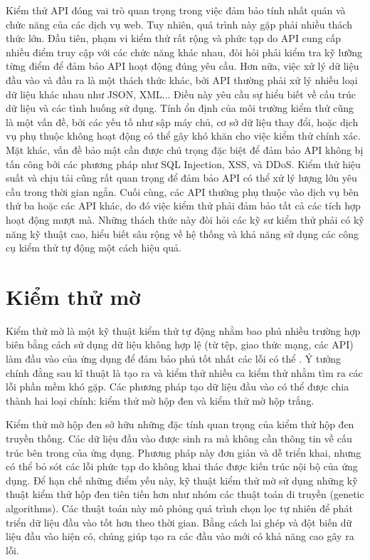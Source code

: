 Kiểm thử API đóng vai trò quan trọng trong việc đảm bảo tính nhất quán và chức năng của các dịch vụ web. Tuy nhiên, quá trình này gặp phải nhiều thách thức lớn. Đầu tiên, phạm vi kiểm thử rất rộng và phức tạp do API cung cấp nhiều điểm truy cập với các chức năng khác nhau, đòi hỏi phải kiểm tra kỹ lưỡng từng điểm để đảm bảo API hoạt động đúng yêu cầu. Hơn nữa, việc xử lý dữ liệu đầu vào và đầu ra là một thách thức khác, bởi API thường phải xử lý nhiều loại dữ liệu khác nhau như JSON, XML... Điều này yêu cầu sự hiểu biết về cấu trúc dữ liệu và các tình huống sử dụng. Tính ổn định của môi trường kiểm thử cũng là một vấn đề, bởi các yếu tố như sập máy chủ, cơ sở dữ liệu thay đổi, hoặc dịch vụ phụ thuộc không hoạt động có thể gây khó khăn cho việc kiểm thử chính xác. Mặt khác, vấn đề bảo mật cần được chú trọng đặc biệt để đảm bảo API không bị tấn công bởi các phương pháp như SQL Injection, XSS, và DDoS. Kiểm thử hiệu suất và chịu tải cũng rất quan trọng để đảm bảo API có thể xử lý lượng lớn yêu cầu trong thời gian ngắn. Cuối cùng, các API thường phụ thuộc vào dịch vụ bên thứ ba hoặc các API khác, do đó việc kiểm thử phải đảm bảo tất cả các tích hợp hoạt động mượt mà. Những thách thức này đòi hỏi các kỹ sư kiểm thử phải có kỹ năng kỹ thuật cao, hiểu biết sâu rộng về hệ thống và khả năng sử dụng các công cụ kiểm thử tự động một cách hiệu quả.



\section{Kiểm thử mờ}
Kiểm thử mờ là một kỹ thuật kiểm thử tự động nhằm bao phủ nhiều trường hợp biên bằng cách sử dụng dữ liệu không hợp lệ (từ tệp, giao thức mạng, các API) làm đầu vào của ứng dụng để đảm bảo phủ tốt nhất các lỗi có thể \cite{8371326}. Ý tưởng chính đằng sau kĩ thuật là tạo ra và kiểm thử nhiều ca kiểm thử nhằm tìm ra các lỗi phần mềm khó gặp. Các phương pháp tạo dữ liệu đầu vào có thể được chia thành hai loại chính: kiểm thử mờ hộp đen và kiểm thử mờ hộp trắng.

Kiểm thử mờ hộp đen sở hữu những đặc tính quan trọng của kiểm thử hộp đen truyền thống. Các dữ liệu đầu vào được sinh ra mà không cần thông tin về cấu trúc bên trong của ứng dụng. Phương pháp này đơn giản và dễ triển khai, nhưng có thể bỏ sót các lỗi phức tạp do không khai thác được kiến trúc nội bộ của ứng dụng. Để hạn chế những điểm yếu này, kỹ thuật kiểm thử mờ sử dụng những kỹ thuật kiểm thử hộp đen tiên tiến hơn như nhóm các thuật toán di truyền (genetic algorithms). Các thuật toán này mô phỏng quá trình chọn lọc tự nhiên để phát triển dữ liệu đầu vào tốt hơn theo thời gian. Bằng cách lai ghép và đột biến dữ liệu đầu vào hiện có, chúng giúp    tạo ra các đầu vào mới có khả năng cao gây ra lỗi.

